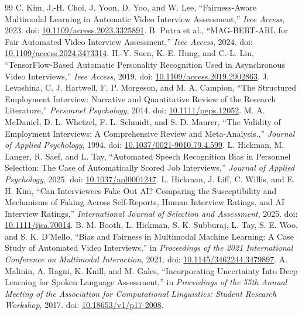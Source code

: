 \documentclass[journal]{IEEEtran}
\begin{document}
\begin{thebibliography}{99}
 C. Kim, J.-H. Choi, J. Yoon, D. Yoo, and W. Lee, ``Fairness-Aware Multimodal Learning in Automatic Video Interview Assessment,'' \emph{Ieee Access}, 2023. doi: \href{https://doi.org/10.1109/access.2023.3325891}{10.1109/access.2023.3325891}.
 B. Putra et al., ``MAG-BERT-ARL for Fair Automated Video Interview Assessment,'' \emph{Ieee Access}, 2024. doi: \href{https://doi.org/10.1109/access.2024.3473314}{10.1109/access.2024.3473314}.
 H.-Y. Suen, K.-E. Hung, and C.-L. Lin, ``TensorFlow-Based Automatic Personality Recognition Used in Asynchronous Video Interviews,'' \emph{Ieee Access}, 2019. doi: \href{https://doi.org/10.1109/access.2019.2902863}{10.1109/access.2019.2902863}.
 J. Levashina, C. J. Hartwell, F. P. Morgeson, and M. A. Campion, ``The Structured Employment Interview: Narrative and Quantitative Review of the Research Literature,'' \emph{Personnel Psychology}, 2014. doi: \href{https://doi.org/10.1111/peps.12052}{10.1111/peps.12052}.
 M. A. McDaniel, D. L. Whetzel, F. L. Schmidt, and S. D. Maurer, ``The Validity of Employment Interviews: A Comprehensive Review and Meta-Analysis.,'' \emph{Journal of Applied Psychology}, 1994. doi: \href{https://doi.org/10.1037/0021-9010.79.4.599}{10.1037/0021-9010.79.4.599}.
 L. Hickman, M. Langer, R. Saef, and L. Tay, ``Automated Speech Recognition Bias in Personnel Selection: The Case of Automatically Scored Job Interviews,'' \emph{Journal of Applied Psychology}, 2025. doi: \href{https://doi.org/10.1037/apl0001247}{10.1037/apl0001247}.
 L. Hickman, J. Liff, C. Willis, and E. H. Kim, ``Can Interviewees Fake Out AI? Comparing the Susceptibility and Mechanisms of Faking Across Self-Reports, Human Interview Ratings, and AI Interview Ratings,'' \emph{International Journal of Selection and Assessment}, 2025. doi: \href{https://doi.org/10.1111/ijsa.70014}{10.1111/ijsa.70014}.
 B. M. Booth, L. Hickman, S. K. Subburaj, L. Tay, S. E. Woo, and S. K. D'Mello, ``Bias and Fairness in Multimodal Machine Learning: A Case Study of Automated Video Interviews,'' in \emph{Proceedings of the 2021 International Conference on Multimodal Interaction}, 2021. doi: \href{https://doi.org/10.1145/3462244.3479897}{10.1145/3462244.3479897}.
 A. Malinin, A. Ragni, K. Knill, and M. Gales, ``Incorporating Uncertainty Into Deep Learning for Spoken Language Assessment,'' in \emph{Proceedings of the 55th Annual Meeting of the Association for Computational Linguistics: Student Research Workshop}, 2017. doi: \href{https://doi.org/10.18653/v1/p17-2008}{10.18653/v1/p17-2008}.

\end{thebibliography}
\end{document}
